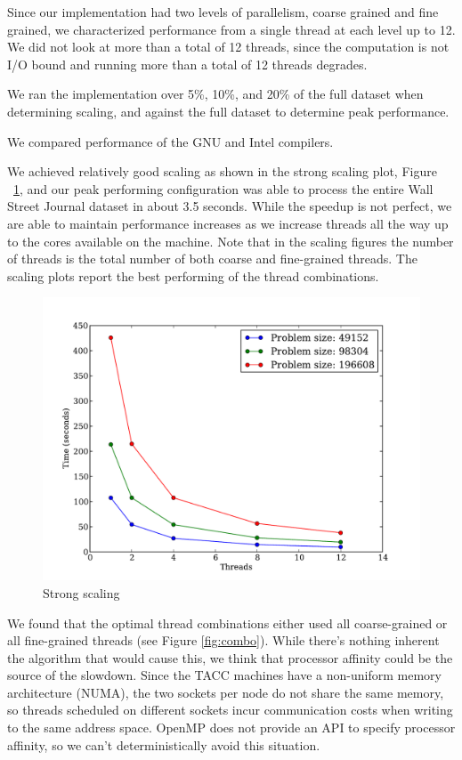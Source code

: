 \documentclass[11pt,onecolumn]{article}
\begin{document}
Since our implementation had two levels of parallelism, coarse grained and fine grained, we characterized performance from a single thread at each level up to 12. We did not look at more than a total of 12 threads, since the computation is not I/O bound and running more than a total of 12 threads degrades.

We ran the implementation over 5\%, 10\%, and 20\% of the full dataset when determining scaling, and against the full dataset to determine peak performance.

We compared performance of the GNU and Intel compilers.


We achieved relatively good scaling as shown in the strong scaling plot, Figure ~\ref{fig:strong_scaling}, and our peak performing configuration was able to process the entire Wall Street Journal dataset in about 3.5 seconds. While the speedup is not perfect, we are able to maintain performance increases as we increase threads all the way up to the cores available on the machine. Note that in the scaling figures the number of threads is the total number of both coarse and fine-grained threads. The scaling plots report the best performing of the thread combinations.

\begin{figure}[h!]
\centering
\includegraphics[width=.75\linewidth]{figures/intel_strong_scaling}
\caption{Strong scaling}
\label{fig:strong_scaling}
\end{figure}

We found that the optimal thread combinations either used all coarse-grained or all fine-grained threads (see Figure \ref{fig:combo}). While there's nothing inherent the algorithm that would cause this, we think that processor affinity could be the source of the slowdown. Since the TACC machines have a non-uniform memory architecture (NUMA), the two sockets per node do not share the same memory, so threads scheduled on different sockets incur communication costs when writing to the same address space. OpenMP does not provide an API to specify processor affinity, so we can't deterministically avoid this situation.
\end{document}
